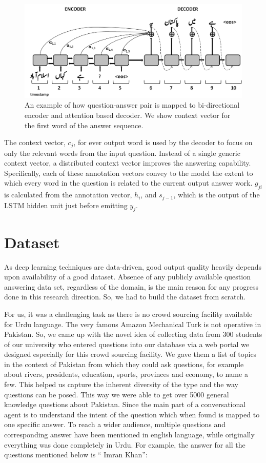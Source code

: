\documentclass[conference]{IEEEtran}
\begin{document}
\begin{figure}[h!]
  \centering
    \includegraphics[width=\linewidth]{Attention-Bi-directional-Encoder-Decoder.png}
  \caption{An example of how question-answer pair is mapped to bi-directional encoder and attention based decoder. We show context vector for the first word of the answer sequence.}
  \label{fig:attention-model}
\end{figure}

The context vector, $c_{j}$, for ever output word is used by the decoder to focus on only the relevant words from the input question. Instead of a single generic context vector, a distributed context vector improves the answering capability. Specifically, each of these annotation vectors convey to the model the extent to which every word in the question is related to the current output answer work. $g_{ji}$ is calculated from the annotation vector, $h_{i}$, and $s_{j-1}$, which is the output of the LSTM hidden unit just before emitting $y_j$.
 
\section{Dataset}
As deep learning techniques are data-driven, good output quality heavily depends upon availability of a good dataset. Absence of any publicly available question answering data set, regardless of the domain, is the main reason for any progress done in this research direction. So, we had to build the dataset from scratch. 

For us, it was a challenging task as there is no crowd sourcing facility available for Urdu language. The very famous Amazon Mechanical Turk is not operative in Pakistan. So, we came up with the novel idea of collecting data from 300 students of our university who entered questions into our database via a web portal we designed especially for this crowd sourcing facility. We gave them a list of topics in the context of Pakistan from which they could ask questions, for example about rivers, presidents, education, sports, provinces and economy, to name a few. This helped us capture the inherent diversity of the type and the way questions can be posed. This way we were able to get over 5000 general knowledge questions about Pakistan. Since the main part of a conversational agent is to understand the intent of the question which when found is mapped to one specific answer. To reach a wider audience, multiple questions and corresponding answer have been mentioned in english language, while originally everything was done completely in Urdu. For example, the answer for all the questions mentioned below is  \textquotedblleft
Imran Khan\textquotedblright:
\end{document}

